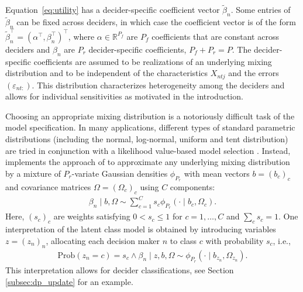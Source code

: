 \documentclass[article,shortnames]{jss}
\begin{document}
Equation~\ref{eq:utility} has a decider-specific coefficient vector $\tilde{\beta}_n$. Some entries of $\tilde{\beta}_n$ can be fixed across deciders, in which case the coefficient vector is of the form $\tilde{\beta}_n^\top = (\alpha^\top, \beta_n^\top)^\top$, where $\alpha \in \mathbb{R}^{P_f}$ are $P_f$ coefficients that are constant across deciders and $\beta_n$ are $P_r$ decider-specific coefficients, $P_f + P_r = P$. The decider-specific coefficients are assumed to be realizations of an underlying mixing distribution and to be independent of the characteristics $X_{ntj}$ and the errors $(\varepsilon_{nt:})$. This distribution characterizes heterogeneity among the deciders and allows for individual sensitivities as motivated in the introduction.

Choosing an appropriate mixing distribution is a notoriously difficult task of the model specification. In many applications, different types of standard parametric distributions (including the normal, log-normal, uniform and tent distribution) are tried in conjunction with a likelihood value-based model selection \citep[pp.\ 136 ff.]{Train:2009}. Instead,  implements the approach of \cite{Oelschlaeger:2020} to approximate any underlying mixing distribution by a mixture of $P_r$-variate Gaussian densities $\phi_{P_r}$ with mean vectors $b=(b_c)_{c}$ and covariance matrices $\Omega=(\Omega_c)_{c}$ using $C$ components:
%
\begin{align*}
\beta_n\mid b,\Omega \sim \sum_{c=1}^{C} s_c \phi_{P_r} (\cdot \mid b_c,\Omega_c).
\end{align*}
%
Here, $(s_c)_{c}$ are weights satisfying $0 < s_c\leq 1$ for $c=1,\dots,C$ and $\sum_c s_c=1$. One interpretation of the latent class model is obtained by introducing variables $z=(z_n)_n$, allocating each decision maker $n$ to class $c$ with probability $s_c$, i.e.,
%
\begin{align*}
\text{Prob}(z_n=c)=s_c \land \beta_n \mid z,b,\Omega \sim \phi_{P_r}(\cdot \mid b_{z_n},\Omega_{z_n}).
\end{align*}
%
\enlargethispage{\baselineskip}
This interpretation allows for decider classifications, see Section \ref{subsec:dp_update} for an example.
\end{document}
